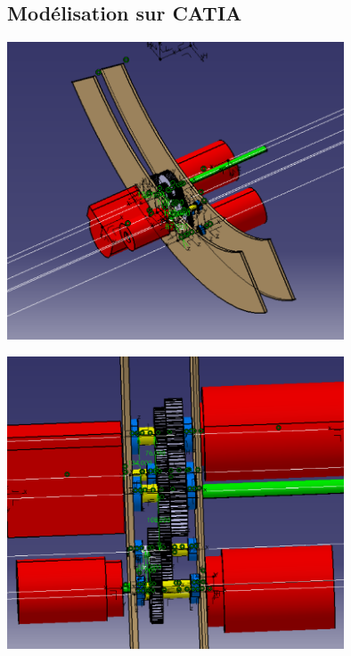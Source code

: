 \documentclass{config}
\begin{document}
\begin{spacing}{1.2}
\newpage
\subsection{Modélisation sur CATIA}

\begin{center}
\includegraphics[width=0.75\textwidth]{BE_3D_complet_ARO.PNG}
\end{center}

\begin{center}
\includegraphics[width=0.75\textwidth]{BE_3D_complet_ARO_vue_dessus.PNG}
\end{center}


\end{spacing}
\end{document}
